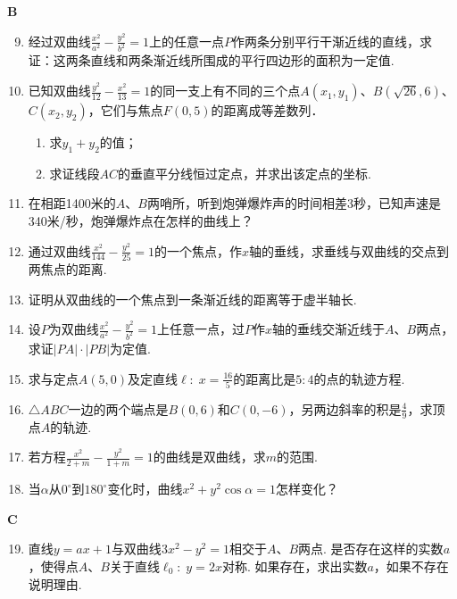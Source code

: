 \begin{center}
    \bfseries B
\end{center}

\begin{enumerate}\setcounter{enumi}{8}
    \item 经过双曲线$\frac{x^2}{a^2}-\frac{y^2}{b^2}=1$上的任意一点$P$作两条分别平行干渐近线的直线，求证：这两条直线和两条渐近线所围成的平行四边形的面积为一定值.
    \item 已知双曲线$\frac{y^2}{12}-\frac{x^2}{13}=1$的同一支上有不同的三个点$A(x_1,y_1)$、$B(\sqrt{26},6)$、$C(x_2,y_2)$，它们与焦点$F(0,5)$的距离成等差数列．
\begin{enumerate}[(1)]
    \item 求$y_1+y_2$的值；
    \item 求证线段$AC$的垂直平分线恒过定点，并求出该定点的坐标.
\end{enumerate}
    \item 在相距1400米的$A$、$B$两哨所，听到炮弹爆炸声的时间相差3秒，已知声速是340米/秒，炮弹爆炸点在怎样的曲线上？
    \item 通过双曲线$\frac{x^2}{144}-\frac{y^2}{25}=1$的一个焦点，作$x$轴的垂线，求垂线与双曲线的交点到两焦点的距离.
    \item 证明从双曲线的一个焦点到一条渐近线的距离等于虚半轴长.
    \item 设$P$为双曲线$\frac{x^2}{a^2}-\frac{y^2}{b^2}=1$上任意一点，过$P$作$x$轴的垂线交渐近线于$A$、$B$两点，求证$|PA|\cdot |PB|$为定值.
    \item  求与定点$A(5,0)$及定直线$\ell:\; x=\frac{16}{5}$的距离比是$5:4$的点的轨迹方程.
    \item  $\triangle ABC$一边的两个端点是$B(0,6)$和$C(0,-6)$，另两边斜率的积是$\frac{4}{9}$，求顶点$A$的轨迹.
        \item  若方程$\frac{x^2}{2+m}-\frac{y^2}{1+m}=1$的曲线是双曲线，求$m$的范围.
        \item  当$\alpha$从$0^{\circ}$到$180^{\circ}$变化时，曲线$x^2+y^2\cos\alpha=1$怎样变化？
  
\end{enumerate}

\begin{center}
    \bfseries C
\end{center}

\begin{enumerate}\setcounter{enumi}{18}
    \item  直线$y=ax+1$与双曲线$3x^2-y^2=1$相交于$A$、$B$两点. 是否存在这样的实数$a$，使得点$A$、$B$关于直线$\ell_0:\; y=2x$对称. 如果存在，求出实数$a$，如果不存在说明理由.
\end{enumerate}

